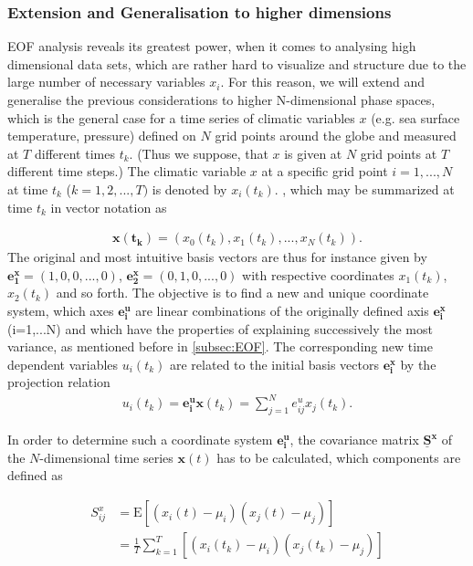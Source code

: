 		\subsubsection{Extension and Generalisation to higher dimensions}
EOF analysis reveals its greatest power, when it comes to analysing  high dimensional data sets, which are rather hard to visualize and structure due to the large number of necessary variables $x_i$.
For this reason, we will extend and generalise the previous considerations to higher N-dimensional phase spaces, which is the general case for a time series of climatic variables $x$ (e.g. sea surface temperature, pressure) defined on $N$ grid points around the globe and measured at $T$ different times $t_k$. (Thus we suppose, that $x$ is given at $N$ grid points at $T$ different time steps.) The climatic variable $x$ at a specific grid point $i=1,...,N$ at time $t_k$ ($k=1,2,...,T)$ is denoted by $x_i(t_k)$.
, which may be summarized at time $t_k$ in  vector notation as

\begin{align*}
	\bm{x(t_k)}=(x_0(t_k),x_1(t_k),...,x_N(t_k)).
\end{align*}
The original and most intuitive basis vectors are thus for instance given by $\bm{e_1^x}=(1,0,0,...,0)$, $\bm{e_2^x}=(0,1,0,...,0)$  with respective coordinates $x_1(t_k)$,$x_2(t_k)$ and so forth.
The objective is to find a new and unique coordinate system, which axes $\bm{e_i^u}$ are linear combinations of the originally defined axis $\bm{e_i^x}$ (i=1,...N) and which have the properties of explaining successively the most variance, as mentioned before in \ref{subsec:EOF}. The corresponding new time dependent variables $u_i(t_k)$ are related to the initial  basis vectors  $\bm{e_i^x}$  by the projection relation 
\begin{align*}\label{eq:projection}
u_i(t_k)=\bm{e_{i}^u} \bm{x}(t_k)= \sum\limits_{j=1}^N e_{ij}^u x_j(t_k). 
\end{align*}

In order to determine such a coordinate system $\bm{e_i^u}$, the covariance matrix $\bm{\underline{S}^x}$ of the $N$-dimensional time series $\bm{x}(t)$ has to be calculated, which components are defined as

\begin{align*}
	S^x_{ij}&=\text{E}[(x_i(t)-\mu_i)(x_j(t)-\mu_j)]\\
		&=\frac{1}{T} \sum\limits_{k=1}^T [(x_i(t_k)-\mu_i)(x_j(t_k)-\mu_j)]
\end{align*}

